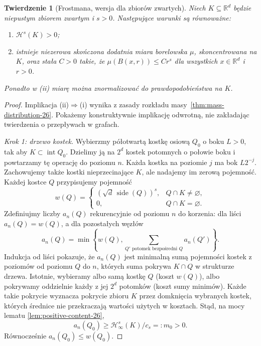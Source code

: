 \documentclass[11pt,a4paper,oneside]{book}
\numberwithin{equation}{chapter}
\theoremstyle{plain}
\newtheorem{twierdzenie}{Twierdzenie}[chapter]
\theoremstyle{definition}
\theoremstyle{remark}
\begin{document}
\begin{twierdzenie}[Frostmana, wersja dla zbiorów zwartych]
\label{thm:frostman-26}
Niech $K\subseteq\mathbb R^d$ będzie niepustym
zbiorem zwartym i $s>0$. Następujące warunki
są równoważne:
\begin{enumerate}[label=(\roman*)]
 \item $\mathcal H^s(K)>0$;
 \item istnieje niezerowa skończona dodatnia miara
 borelowska $\mu$, skoncentrowana na $K$, oraz stała
 $C>0$ takie, że
 $\mu(B(x,r))\le Cr^s$ dla wszystkich
 $x\in\mathbb R^d$ i $r>0$.
\end{enumerate}
Ponadto w (ii) miarę można znormalizować do
prawdopodobieństwa na $K$.
\end{twierdzenie}
\begin{proof}
Implikacja (ii)$\Rightarrow$(i) wynika z zasady
rozkładu masy~\ref{thm:mass-distribution-26}.
Pokażemy konstruktywnie implikację odwrotną, nie
zakładając twierdzenia o przepływach w grafach.

\emph{Krok 1: drzewo kostek.} Wybierzmy półotwartą
kostkę osiową $Q_0$ o boku $L>0$, tak aby
$K\subset\operatorname{int}Q_0$. Dzielimy ją na
$2^d$ kostek potomnych o połowie boku i powtarzamy
tę operację do poziomu $n$. Każda kostka na poziomie
$j$ ma bok $L2^{-j}$. Zachowujemy także kostki
nieprzecinające $K$, ale nadajemy im zerową pojemność.
Każdej kostce $Q$ przypisujemy pojemność
\[
 w(Q)=\begin{cases}
 (\sqrt d\,\operatorname{side}(Q))^s,&Q\cap K\ne\varnothing,\\
 0,&Q\cap K=\varnothing.
 \end{cases}
\]
Zdefiniujmy liczby $a_n(Q)$ rekurencyjnie od poziomu
$n$ do korzenia: dla liści $a_n(Q)=w(Q)$, a dla
pozostałych węzłów
\begin{equation}\label{eq:frostman-recursion-26}
 a_n(Q)=\min\left\{w(Q),\sum_{Q'\text{ potomek bezpośredni }Q}
 a_n(Q')\right\}.
\end{equation}
Indukcja od liści pokazuje, że $a_n(Q)$ jest minimalną
sumą pojemności kostek z poziomów od poziomu $Q$
do $n$, których suma pokrywa $K\cap Q$ w strukturze
drzewa. Istotnie, wybieramy albo samą kostkę $Q$
(koszt $w(Q)$), albo pokrywamy oddzielnie każdy z jej
$2^d$ potomków (koszt sumy minimów). Każde takie
pokrycie wyznacza pokrycie zbioru $K$ przez domknięcia
wybranych kostek, których średnice nie przekraczają
wartości użytych w kosztach. Stąd, na mocy lematu
\ref{lem:positive-content-26},
\begin{equation}\label{eq:frostman-positive-26}
 a_n(Q_0)\ge\mathcal H^s_\infty(K)/c_s=:m_0>0.
\end{equation}
Równocześnie $a_n(Q_0)\le w(Q_0)$.


\end{proof}
\end{document}
